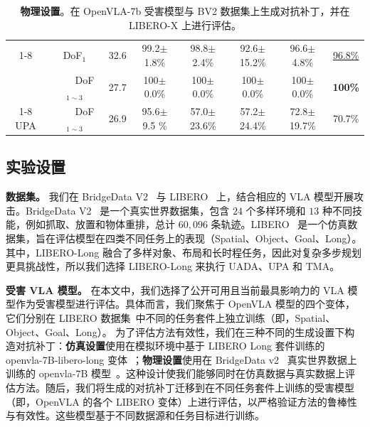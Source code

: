 \begin{table}[htbp]
\begin{subtable}[t]{\textwidth}
{\begin{tabular}{c|c|c|ccccc}
\cmidrule{1-8}
\multirow{2}{*}{UADA}        & DoF$_1$              & 32.6                  & 99.2$\pm$1.8\%               & 98.8$\pm$2.4\%               & 92.6$\pm$15.2\%               & 96.6$\pm$4.8\%     & \cellcolor{mygray}\underline{96.8\%}  \\
                             & ~~~~DoF$_{1\sim3}$      & 27.7                  & 100$\pm$0.0\%               & 100$\pm$0.0\%               & 100$\pm$0.0\%               & 100$\pm$0.0\%     & \cellcolor{mygray}\textbf{100\%}  \\
\cmidrule{1-8}
UPA                          & ~~~~DoF$_{1\sim3}$      & 26.9                  & 95.6$\pm$9.5 \%               & 57.0$\pm$23.6\%               & 57.2$\pm$24.4\%               & 72.8$\pm$19.7\%     & \cellcolor{mygray}70.7\%  \\
\bottomrule
\end{tabular}}
						\setlength{\abovecaptionskip}{0.3cm}
						\setlength{\belowcaptionskip}{-0.1cm}
                        \renewcommand{\thesubtable}{b}
                        \vspace{5pt}
						\caption{\textbf{物理设置}。在 OpenVLA-7b 受害模型与 BV2 数据集上生成对抗补丁，并在 LIBERO-X 上进行评估。}
						\label{table:physical-results}
					\end{subtable}
\end{table}

\subsection{实验设置}\label{sec:experiment_setup}
\textbf{数据集。} 
我们在 BridgeData V2~\cite{bridgev2} 与 LIBERO~\cite{LIBREO} 上，结合相应的 VLA 模型开展攻击。BridgeData V2~\cite{bridgev2} 是一个真实世界数据集，包含 $24$ 个多样环境和 $13$ 种不同技能，例如抓取、放置和物体重排，总计 $60,096$ 条轨迹。LIBERO~\cite{LIBREO} 是一个仿真数据集，旨在评估模型在四类不同任务上的表现（Spatial、Object、Goal、Long）。其中，LIBERO-Long 融合了多样对象、布局和长时程任务，因此对复杂多步规划更具挑战性，所以我们选择 LIBERO-Long 来执行 UADA、UPA 和 TMA。

\textbf{受害 VLA 模型。}
在本文中，我们选择了公开可用且当前最具影响力的 VLA 模型作为受害模型进行评估。具体而言，我们聚焦于 OpenVLA 模型的四个变体，它们分别在 LIBERO 数据集~\cite{LIBREO}中不同的任务套件上独立训练（即，Spatial、Object、Goal、Long）。
为了评估方法有效性，我们在三种不同的生成设置下构造对抗补丁：\textbf{仿真设置}使用在模拟环境中基于 LIBERO Long 套件训练的 openvla-7B-libero-long 变体~\cite{kim24openvla}；\textbf{物理设置}使用在 BridgeData v2~\cite{bridgev2} 真实世界数据上训练的 openvla-7B 模型~\cite{kim24openvla}。这种设计使我们能够同时在仿真数据与真实数据上评估方法。随后，我们将生成的对抗补丁迁移到在不同任务套件上训练的受害模型（即，OpenVLA 的各个 LIBERO 变体）上进行评估，以严格验证方法的鲁棒性与有效性。这些模型基于不同数据源和任务目标进行训练。


